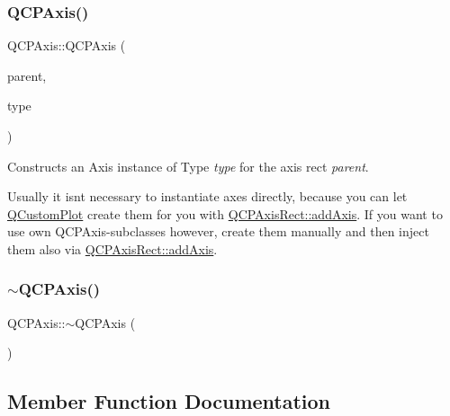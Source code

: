 \subsubsection{\texorpdfstring{QCPAxis()}{QCPAxis()}}
{\footnotesize\ttfamily Q\+C\+P\+Axis\+::\+Q\+C\+P\+Axis (\begin{DoxyParamCaption}\item[{\mbox{\hyperlink{class_q_c_p_axis_rect}{Q\+C\+P\+Axis\+Rect}} $\ast$}]{parent,  }\item[{\mbox{\hyperlink{class_q_c_p_axis_ae2bcc1728b382f10f064612b368bc18a}{Axis\+Type}}}]{type }\end{DoxyParamCaption})\hspace{0.3cm}{\ttfamily [explicit]}}

Constructs an Axis instance of Type {\itshape type} for the axis rect {\itshape parent}.

Usually it isn\textquotesingle{}t necessary to instantiate axes directly, because you can let \mbox{\hyperlink{class_q_custom_plot}{Q\+Custom\+Plot}} create them for you with \mbox{\hyperlink{class_q_c_p_axis_rect_a2dc336092ccc57d44a46194c8a23e4f4}{Q\+C\+P\+Axis\+Rect\+::add\+Axis}}. If you want to use own Q\+C\+P\+Axis-\/subclasses however, create them manually and then inject them also via \mbox{\hyperlink{class_q_c_p_axis_rect_a2dc336092ccc57d44a46194c8a23e4f4}{Q\+C\+P\+Axis\+Rect\+::add\+Axis}}. \mbox{\label{class_q_c_p_axis_a7cfa27ea9da0bb1fe0ae995572c0b85d}} 
\subsubsection{\texorpdfstring{$\sim$QCPAxis()}{~QCPAxis()}}
{\footnotesize\ttfamily Q\+C\+P\+Axis\+::$\sim$\+Q\+C\+P\+Axis (\begin{DoxyParamCaption}{ }\end{DoxyParamCaption})\hspace{0.3cm}{\ttfamily [virtual]}}



\subsection{Member Function Documentation}
\mbox{\label{class_q_c_p_axis_adbaeffcdc2707f2bd5dc1bbd11236770}} 
